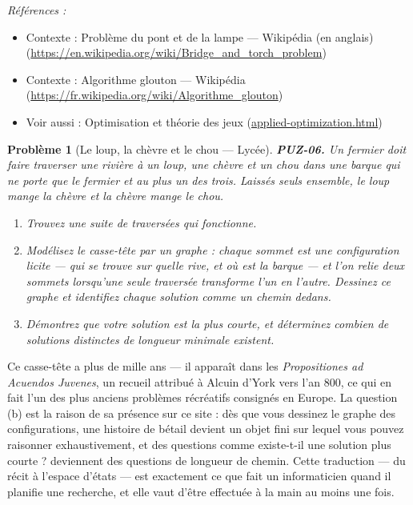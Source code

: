 \documentclass[11pt]{article}
\newtheorem{problem}{Problème}
\newenvironment{refs}{\par\small\noindent\emph{Références :}\begin{itemize}\setlength\itemsep{0pt}}{\end{itemize}\normalsize}
\begin{document}
\begin{refs}
\item Contexte : Problème du pont et de la lampe --- Wikipédia (en anglais) (\url{https://en.wikipedia.org/wiki/Bridge_and_torch_problem})
\item Contexte : Algorithme glouton --- Wikipédia (\url{https://fr.wikipedia.org/wiki/Algorithme_glouton})
\item Voir aussi : Optimisation et théorie des jeux (\url{applied-optimization.html})
\end{refs}

\bigskip

\begin{problem}[{Le loup, la chèvre et le chou --- Lycée}]
\textbf{PUZ-06.} Un fermier doit faire traverser une rivière à un loup, une chèvre et
un chou dans une barque qui ne porte que le fermier et au plus un des trois. Laissés seuls
ensemble, le loup mange la chèvre et la chèvre mange le chou.
\begin{enumerate}
\item[(a)] Trouvez une suite de traversées qui fonctionne.
\item[(b)] Modélisez le casse-tête par un graphe : chaque sommet est une configuration licite ---
qui se trouve sur quelle rive, et où est la barque --- et l'on relie deux sommets lorsqu'une
seule traversée transforme l'un en l'autre. Dessinez ce graphe et identifiez chaque
solution comme un chemin dedans.
\item[(c)] Démontrez que votre solution est la plus courte, et déterminez combien de solutions
distinctes de longueur minimale existent.
\end{enumerate}

\end{problem}

\noindent Ce casse-tête a plus de mille ans --- il apparaît dans les
\textit{Propositiones ad Acuendos Juvenes}, un recueil attribué à Alcuin d'York vers l'an
800, ce qui en fait l'un des plus anciens problèmes récréatifs consignés en Europe. La
question (b) est la raison de sa présence sur ce site : dès que vous dessinez le graphe des
configurations, une histoire de bétail devient un objet fini sur lequel vous pouvez
raisonner exhaustivement, et des questions comme \og{} existe-t-il une solution plus
courte ? \fg{} deviennent des questions de longueur de chemin. Cette traduction --- du récit à
l'espace d'états --- est exactement ce que fait un informaticien quand il planifie une
recherche, et elle vaut d'être effectuée à la main au moins une fois.
\end{document}
